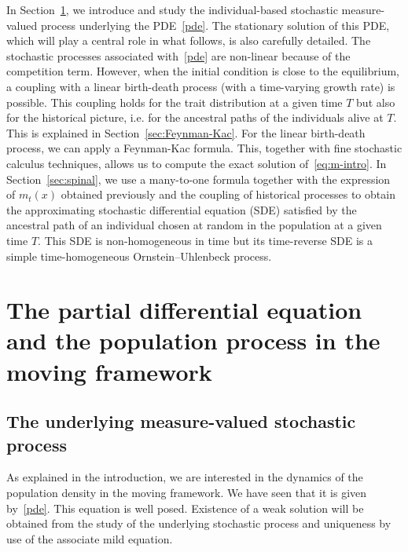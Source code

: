 \documentclass[10pt]{amsart}
\theoremstyle{definition}\newtheorem{defi}[theo]{Definition}\newtheorem{rema}[theo]{Remark}\newtheorem{exam}[theo]{Example}\newtheorem{exem}[theo]{Example}\newtheorem{nota}[theo]{Notation}
\begin{document}
In Section~\ref{sec:PDE}, we introduce and study the individual-based stochastic measure-valued process underlying the PDE~\eqref{pde}. The stationary solution of this PDE, which will play a central role in what follows, is also carefully detailed. The stochastic processes associated with~\eqref{pde} are non-linear because of the competition term. However, when the initial condition is close to the equilibrium, a coupling with a linear birth-death process (with a time-varying growth rate) is possible. This coupling holds for the trait distribution at a given time $T$ but also for the historical picture, i.e. for the ancestral paths of the individuals alive at $T$. This is explained in Section~\ref{sec:Feynman-Kac}. For the linear birth-death process, we can apply a Feynman-Kac formula. This, together with fine stochastic calculus techniques, allows us to compute the exact solution of~\eqref{eq:m-intro}. In Section~\ref{sec:spinal}, we use a many-to-one formula together with the expression of $m_t(x)$ obtained previously and the coupling of historical processes to obtain the approximating stochastic differential equation (SDE) satisfied by the ancestral path of an individual chosen at random in the population at a given time $T$. This SDE is non-homogeneous in time but its time-reverse SDE is a simple time-homogeneous Ornstein--Uhlenbeck process.


\section{The partial differential equation and the population process in the moving framework}\label{sec:PDE}

\subsection{The underlying measure-valued stochastic process}\label{sec:measure-valued-sto-pro}

As explained in the introduction, we are interested in the dynamics of the population density in the moving framework. We have seen that it is given by~\eqref{pde}. This equation is well posed. Existence of a weak solution will be obtained from the study of the underlying stochastic process and uniqueness by use of the associate mild equation.

\end{document}

